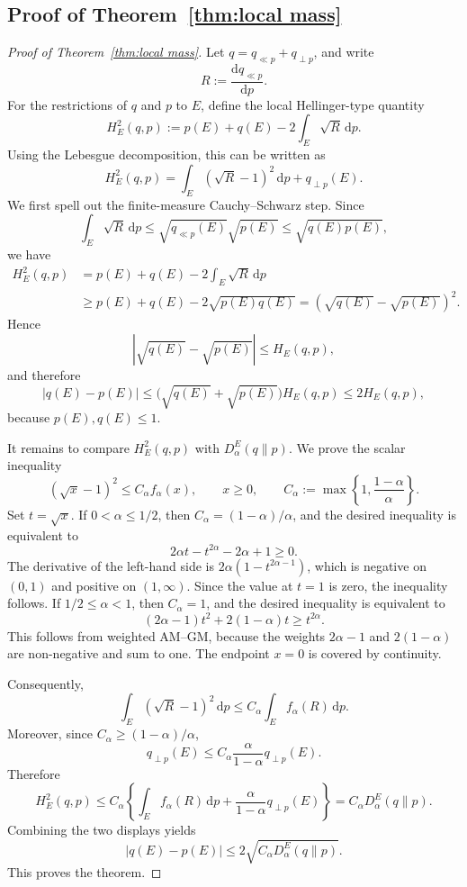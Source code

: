\documentclass[11pt,a4paper]{article}
\theoremstyle{compactplain}
\theoremstyle{compactdefinition}
\numberwithin{equation}{section}
\begin{document}
\subsection*{Proof of Theorem~\ref{thm:local mass}}
\begin{proof}[Proof of Theorem~\ref{thm:local mass}]
Let \(q=q_{\ll p}+q_{\perp p}\), and write
\[
 R:=\frac{\mathrm d q_{\ll p}}{\mathrm d p}.
\]
For the restrictions of \(q\) and \(p\) to \(E\), define the local Hellinger-type
quantity
\[
 H_E^2(q,p)
 :=p(E)+q(E)-2\int_E\sqrt R\,\mathrm d p.
\]
Using the Lebesgue decomposition, this can be written as
\[
 H_E^2(q,p)
 =\int_E(\sqrt R-1)^2\,\mathrm d p+q_{\perp p}(E).
\]
We first spell out the finite-measure Cauchy--Schwarz step. Since
\[
 \int_E\sqrt R\,\mathrm d p
 \le
 \sqrt{q_{\ll p}(E)}\sqrt{p(E)}
 \le
 \sqrt{q(E)p(E)},
\]
we have
\[
\begin{aligned}
 H_E^2(q,p)
 &=p(E)+q(E)-2\int_E\sqrt R\,\mathrm d p \\
 &\ge p(E)+q(E)-2\sqrt{p(E)q(E)}
 =\left(\sqrt{q(E)}-\sqrt{p(E)}\right)^2 .
\end{aligned}
\]
Hence
\[
 \left|\sqrt{q(E)}-\sqrt{p(E)}\right|
 \le H_E(q,p),
\]
and therefore
\[
 |q(E)-p(E)|
 \le
 \bigl(\sqrt{q(E)}+\sqrt{p(E)}\bigr)H_E(q,p)
 \le 2H_E(q,p),
\]
because \(p(E),q(E)\le1\).

It remains to compare \(H_E^2(q,p)\) with \(D_\alpha^E(q\|p)\). We prove the
scalar inequality
\[
 (\sqrt x-1)^2\le C_\alpha f_\alpha(x),
 \qquad x\ge0,
 \qquad
 C_\alpha:=\max\left\{1,\frac{1-\alpha}{\alpha}\right\}.
\]
Set \(t=\sqrt x\). If \(0<\alpha\le1/2\), then
\(C_\alpha=(1-\alpha)/\alpha\), and the desired inequality is equivalent to
\[
 2\alpha t-t^{2\alpha}-2\alpha+1\ge0 .
\]
The derivative of the left-hand side is
\(2\alpha(1-t^{2\alpha-1})\), which is negative on \((0,1)\) and positive on
\((1,\infty)\). Since the value at \(t=1\) is zero, the inequality follows. If
\(1/2\le\alpha<1\), then \(C_\alpha=1\), and the desired inequality is equivalent
to
\[
 (2\alpha-1)t^2+2(1-\alpha)t\ge t^{2\alpha}.
\]
This follows from weighted AM--GM, because the weights \(2\alpha-1\) and
\(2(1-\alpha)\) are non-negative and sum to one. The endpoint \(x=0\) is covered
by continuity.

Consequently,
\[
 \int_E(\sqrt R-1)^2\,\mathrm d p
 \le C_\alpha\int_E f_\alpha(R)\,\mathrm d p .
\]
Moreover, since \(C_\alpha\ge (1-\alpha)/\alpha\),
\[
 q_{\perp p}(E)
 \le
 C_\alpha\frac{\alpha}{1-\alpha}q_{\perp p}(E).
\]
Therefore
\[
 H_E^2(q,p)
 \le
 C_\alpha\left\{
 \int_E f_\alpha(R)\,\mathrm d p
 +\frac{\alpha}{1-\alpha}q_{\perp p}(E)
 \right\}
 =C_\alpha D_\alpha^E(q\|p).
\]
Combining the two displays yields
\[
 |q(E)-p(E)|
 \le
 2\sqrt{C_\alpha D_\alpha^E(q\|p)}.
\]
This proves the theorem.
\end{proof}
\end{document}
